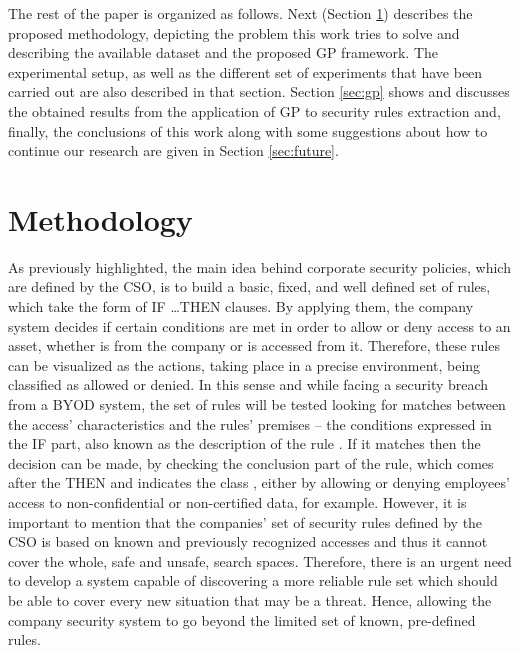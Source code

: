 \documentclass[runningheads]{llncs}
\begin{document}
The rest of the paper is organized as follows. Next (Section
\ref{sec:methodology}) describes the proposed methodology, depicting
the problem this work tries to solve and describing the available
dataset and the proposed GP framework. The experimental setup, as
well as the different set of experiments that have been carried out
are also described in that section. Section \ref{sec:gp} shows and discusses the
obtained results from the application of GP to security rules
extraction and, finally, the conclusions of this work along with some
suggestions about how to continue our research are given in Section
\ref{sec:future}.

\section{Methodology}
\label{sec:methodology}

As previously highlighted, the main idea behind corporate security
policies, which are defined by the CSO, is to build a basic, fixed,
and well defined set of rules, which take the form of \textsc{IF
  \ldots THEN} clauses. By applying them, the company system decides if certain conditions are met in order to allow or
deny access to an asset, whether is from the company or is accessed from it. 
Therefore, these rules can be visualized as the actions, taking place in a precise environment, being classified as
allowed or denied. In this sense and while facing a security breach
from a BYOD system, the set of rules will be tested looking for
matches between the access' characteristics and the rules' premises --
the conditions expressed in the IF part, also known as the description
of the rule \cite{DeFalco2002257}. If it matches then the decision can
be made, by checking the conclusion part of the rule, which comes
after the THEN and indicates the class \cite{DeFalco2002257}, either
by allowing or denying employees' access to non-confidential
 or non-certified data, for example. However, it is important to
 mention that the companies'  set of security rules defined by the CSO is
 based on known and previously recognized accesses and thus it cannot
 cover the whole, safe and unsafe, search spaces. Therefore,
 there is an urgent need to develop a system capable of discovering a
 more reliable rule set which should be able to cover every new
 situation that may be a threat. Hence, allowing the company security
 system to go beyond the limited set of known, pre-defined rules.  %
\end{document}
